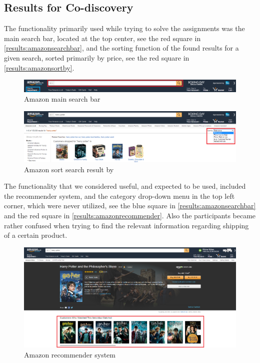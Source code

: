 \subsection{Results for Co-discovery}
The functionality primarily used while trying to solve the assignments was the main search bar, located at the top center, see the red square in \autoref{results:amazonsearchbar}, and the sorting function of the found results for a given search, sorted primarily by price, see the red square in \autoref{results:amazonsortby}.

\begin{figure}[h]
\includegraphics[scale=0.3]{./includes/amazon_search_bar.png}
\caption{Amazon main search bar}
\label{results:amazonsearchbar}
\end{figure}

\begin{figure}[h]
\includegraphics[scale=0.3]{./includes/amazon_sort_by.png}
\caption{Amazon sort search result by}
\label{results:amazonsortby}
\end{figure}

The functionality that we considered useful, and expected to be used, included the recommender system, and the category drop-down menu in the top left corner, which were never utilized, see the blue square in \autoref{results:amazonsearchbar} and the red square in \autoref{results:amazonrecommender}. Also the participants became rather confused when trying to find the relevant information regarding shipping of a certain product.

\begin{figure}[H]
\includegraphics[scale=0.265]{./includes/amazon_recommender}
\caption{Amazon recommender system}
\label{results:amazonrecommender}
\end{figure}


